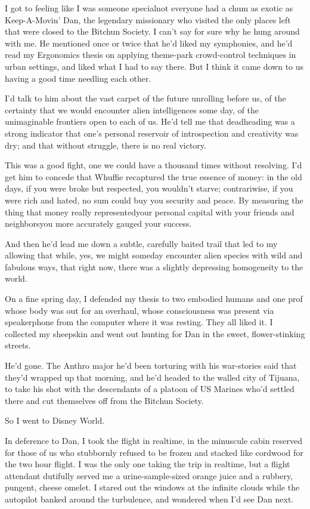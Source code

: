I got to feeling like I was someone special{\dash}not everyone had a chum
as exotic as Keep-A-Movin' Dan, the legendary missionary who
visited the only places left that were closed to the Bitchun
Society. I can't say for sure why he hung around with me. He
mentioned once or twice that he'd liked my symphonies, and he'd
read my Ergonomics thesis on applying theme-park crowd-control
techniques in urban settings, and liked what I had to say there.
But I think it came down to us having a good time needling each
other.

I'd talk to him about the vast carpet of the future unrolling
before us, of the certainty that we would encounter alien
intelligences some day, of the unimaginable frontiers open to each
of us. He'd tell me that deadheading was a strong indicator that
one's personal reservoir of introspection and creativity was dry;
and that without struggle, there is no real victory.

This was a good fight, one we could have a thousand times without
resolving. I'd get him to concede that Whuffie recaptured the true
essence of money: in the old days, if you were broke but respected,
you wouldn't starve; contrariwise, if you were rich and hated, no
sum could buy you security and peace. By measuring the thing that
money really represented{\dash}your personal capital with your friends
and neighbors{\dash}you more accurately gauged your success.

And then he'd lead me down a subtle, carefully baited trail that
led to my allowing that while, yes, we might someday encounter
alien species with wild and fabulous ways, that right now, there
was a slightly depressing homogeneity to the world.

On a fine spring day, I defended my thesis to two embodied humans
and one prof whose body was out for an overhaul, whose
consciousness was present via speakerphone from the computer where
it was resting. They all liked it. I collected my sheepskin and
went out hunting for Dan in the sweet, flower-stinking streets.

He'd gone. The Anthro major he'd been torturing with his
war-stories said that they'd wrapped up that morning, and he'd
headed to the walled city of Tijuana, to take his shot with the
descendants of a platoon of US Marines who'd settled there and cut
themselves off from the Bitchun Society.

So I went to Disney World.

In deference to Dan, I took the flight in realtime, in the
minuscule cabin reserved for those of us who stubbornly refused to
be frozen and stacked like cordwood for the two hour flight. I was
the only one taking the trip in realtime, but a flight attendant
dutifully served me a urine-sample-sized orange juice and a
rubbery, pungent, cheese omelet. I stared out the windows at the
infinite clouds while the autopilot banked around the turbulence,
and wondered when I'd see Dan next.

